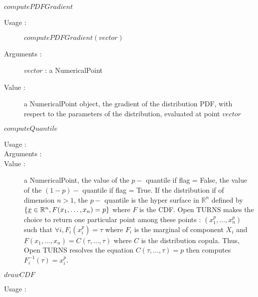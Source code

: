 \begin{description}
\begin{description}
  \item $computePDFGradient$
    \begin{description}
    \item[Usage :] $computePDFGradient(vector)$
    \item[Arguments :] $vector$ : a NumericalPoint
    \item[Value :] a NumericalPoint object, the gradient of the distribution PDF, with respect to the parameters of the distribution, evaluated at point $vector$
    \end{description}
    \bigskip

  \item $computeQuantile$
    \begin{description}
    \item[Usage :] \rule{0pt}{1em}
    \item[Arguments :] \rule{0pt}{1em}
    \item[Value :] a NumericalPoint, the value of the $p-$ quantile if flag = False, the value of the $(1-p)-$ quantile if flag = True. If the distribution if of dimension $n>1$, the $p-$ quantile is the hyper surface in $\mathbb{R}^n$ defined by  $\{{\underline{x}}\in \mathbb{R}^n, F(x_1, \dots, x_n) = p \}$ where $F$ is the CDF. Open TURNS makes the choice to return one particular point among these points : $(x_1^p, \dots, x_n^p)$ such that $\forall i, F_i(x_i^p) =  \tau$ where $F_i$ is the marginal of component $X_i$ and $F(x_1, \dots, x_n) = C(\tau, \dots, \tau)$ where $C$ is the distribution copula. Thus, Open TURNS resolves the equation $ C(\tau, \dots, \tau)=p$ then computes $F_i^{-1}(\tau) = x_i^p$.
    \end{description}
    \bigskip

  \item $drawCDF$
    \begin{description}
    \item[Usage :] \rule{0pt}{1em}


\end{description}
\end{description}
\end{description}
